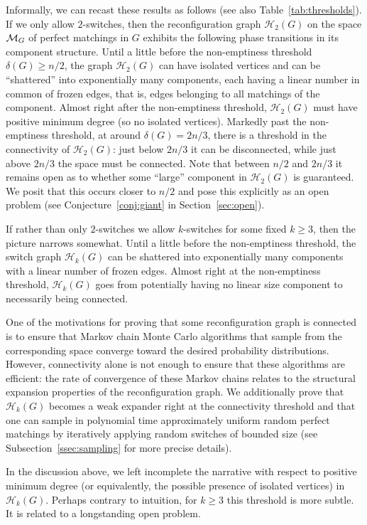 \documentclass[11pt,a4paper]{article}
\theoremstyle{definition}
\begin{document}
Informally, we can recast these results as follows (see also
Table~\ref{tab:thresholds}). If we only allow $2$-switches, then the reconfiguration graph
$\mathcal H_2(G)$ on the space ${\cal M}_G$ of perfect matchings in $G$ exhibits the following phase transitions in
its component structure. Until a little before the non-emptiness threshold
$\delta(G)\ge n/2$, the graph $\mathcal H_2(G)$ can have isolated vertices and can be
``shattered'' into exponentially many components, each having a linear number in common of frozen
edges, that is, edges belonging to all matchings of the
component. Almost right after the non-emptiness threshold, $\mathcal H_2(G)$ must have
positive minimum degree (so no isolated vertices). Markedly past the
non-emptiness threshold, at around $\delta(G)=2n/3$, there is a threshold in the
connectivity of $\mathcal H_2(G)$: just below $2n/3$ it can be disconnected, while just
above $2n/3$ the space must be connected. Note that between $n/2$ and $2n/3$ it
remains open as to whether some ``large'' component in $\mathcal H_2(G)$ is guaranteed.
We posit that this occurs closer to $n/2$ and pose this explicitly as an open problem (see Conjecture~\ref{conj:giant} in Section~\ref{sec:open}).

If rather than only $2$-switches we allow $k$-switches for some fixed $k\ge 3$,
then the picture narrows somewhat. Until a little before the non-emptiness threshold, the
switch graph $\mathcal H_k(G)$ can be shattered into exponentially many components with a linear
number of frozen edges. Almost right at the non-emptiness threshold, $\mathcal H_k(G)$
goes from potentially having no linear size component to necessarily being connected.




One of the motivations for proving that some reconfiguration graph is connected is
to ensure that Markov chain Monte Carlo algorithms that sample from the corresponding space converge toward the desired probability distributions. However,
connectivity alone is not enough to ensure that these algorithms are
efficient: the rate of convergence of these Markov chains 
relates to the structural expansion properties of the
reconfiguration graph. We additionally prove that $\mathcal H_k(G)$ becomes a weak expander right at
the connectivity threshold 
and that one can sample in
polynomial time approximately uniform random perfect matchings by iteratively
applying random switches of bounded size (see
Subsection~\ref{ssec:sampling} for more precise details).

In the discussion above, we left incomplete the narrative with respect to positive minimum degree (or equivalently, the possible presence of isolated vertices) in $\mathcal H_k(G)$.
Perhaps contrary to intuition, for $k\ge 3$ this threshold is more subtle. It is related to a longstanding open problem.
\end{document}

